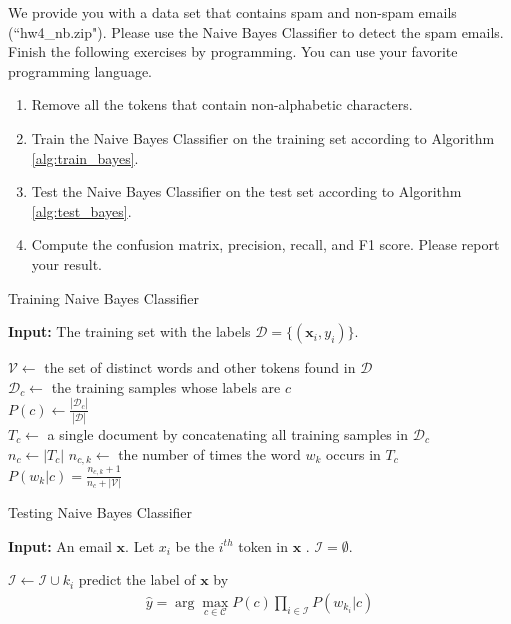 \documentclass[11pt,letter,notitlepage]{article}
\begin{document}
\newpage
\begin{exercise}
We provide you with a data set that contains spam and non-spam emails (``hw4\_nb.zip"). Please use the Naive Bayes Classifier to detect the spam emails.
Finish the following exercises by programming. You can use your favorite programming language.
\begin{enumerate}
\item Remove all the tokens that contain non-alphabetic characters.
\item Train the Naive Bayes Classifier on the training set according to Algorithm \ref{alg:train_bayes}.
\item Test the Naive Bayes Classifier on the test set according to Algorithm \ref{alg:test_bayes}.
\item Compute the confusion matrix, precision, recall, and F1 score. Please report your result.
\end{enumerate}

\end{exercise}

\begin{algorithm}
\caption{Training Naive Bayes Classifier}
\label{alg:train_bayes}
\textbf{Input:} The training set with the labels $\mathcal{D}=\{(\mathbf{x}_i,y_i)\}.$
\begin{algorithmic}[1]
\STATE $\mathcal{V}\leftarrow$ the set of distinct words and other tokens found in $\mathcal{D}$\\
\STATE $\mathcal{D}_c\leftarrow$ the training samples whose labels are $c$\\
\STATE $P(c)\leftarrow\frac{|\mathcal{D}_c|}{|\mathcal{D}|}$\\
\STATE $T_c\leftarrow$ a single document by concatenating all training samples in $\mathcal{D}_c$\\
\STATE $n_c\leftarrow |T_c|$
\STATE $n_{c,k}\leftarrow$ the number of times the word $w_k$ occurs in $T_c$\\
\STATE $P(w_k|c)=\frac{n_{c,k}+1}{n_c+|\mathcal{V}|}$
\ENDFOR
\ENDFOR
\end{algorithmic}
\end{algorithm}

\begin{algorithm}
\caption{Testing Naive Bayes Classifier }
\label{alg:test_bayes}
\textbf{Input:} An email $\mathbf{x}$. Let $x_i$ be the $i^{th}$ token in $\mathbf{x}$ . $\mathcal{I}=\emptyset.$
\begin{algorithmic}[1]
\STATE $\mathcal{I}\leftarrow\mathcal{I}\cup k_i$
\ENDIF
\ENDFOR
\STATE predict the label of $\mathbf{x}$ by 
\begin{align*}
    \hat{y}=\arg\max_{c\in\mathcal{C}} P(c)\prod_{i\in\mathcal{I}}P(w_{k_i}|c)
\end{align*}
\end{algorithmic}
\end{algorithm}
\end{document}
